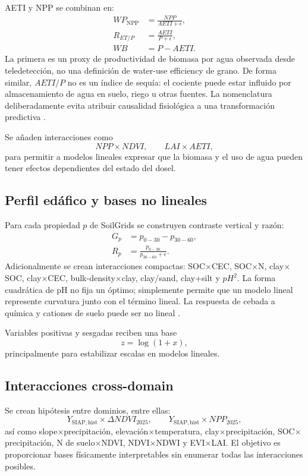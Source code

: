 AETI y NPP se combinan en:
\begin{align}
WP_{\mathrm{NPP}}
&=
\frac{NPP}{AETI+\epsilon},\\
R_{ET/P}
&=
\frac{AETI}{P+\epsilon},\\
WB
&=
P-AETI.
\end{align}
La primera es un proxy de productividad de biomasa por agua observada desde teledetección, no
una definición de water-use efficiency de grano. De forma similar, $AETI/P$ no es un índice de
sequía: el cociente puede estar influido por almacenamiento de agua en suelo, riego u otras
fuentes. La nomenclatura deliberadamente evita atribuir causalidad fisiológica a una
transformación predictiva \citep{Dhonthi2024}.

Se añaden interacciones como
\[
NPP\times NDVI,\qquad LAI\times AETI,
\]
para permitir a modelos lineales expresar que la biomasa y el uso de agua pueden tener
efectos dependientes del estado del dosel.

\subsection{Perfil edáfico y bases no lineales}

Para cada propiedad $p$ de SoilGrids se construyen contraste vertical y razón:
\begin{align}
G_p &= p_{0-30}-p_{30-60},\\
R_p &= \frac{p_{0-30}}{p_{30-60}+\epsilon}.
\end{align}
Adicionalmente se crean interacciones compactas: SOC$\times$CEC,
SOC$\times$N, clay$\times$SOC, clay$\times$CEC, bulk-density$\times$clay,
clay/sand, clay+silt y $pH^2$. La forma cuadrática de pH no fija un óptimo; simplemente
permite que un modelo lineal represente curvatura junto con el término lineal. La respuesta de
cebada a química y cationes de suelo puede ser no lineal \citep{Holland2021}.

Variables positivas y sesgadas reciben una base
\[
z=\log(1+x),
\]
principalmente para estabilizar escalas en modelos lineales.

\subsection{Interacciones cross-domain}

Se crean hipótesis entre dominios, entre ellas:
\[
Y_{\mathrm{SIAP,hist}}\times\Delta NDVI_{2025},
\qquad
Y_{\mathrm{SIAP,hist}}\times NPP_{2025},
\]
así como slope$\times$precipitación, elevación$\times$temperatura,
clay$\times$precipitación, SOC$\times$precipitación, N de suelo$\times$NDVI,
NDVI$\times$NDWI y EVI$\times$LAI. El objetivo es proporcionar bases físicamente
interpretables sin enumerar todas las interacciones posibles.

